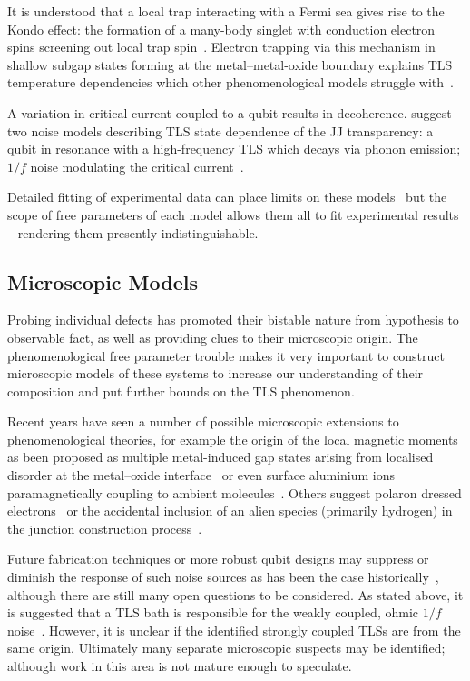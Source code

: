 It is understood that a local trap interacting with a Fermi sea gives rise to the Kondo effect: the formation of a many-body singlet with conduction electron spins screening out local trap spin~\cite{Wilson1975}.
Electron trapping via this mechanism in shallow subgap states forming at the metal--metal-oxide boundary explains TLS temperature dependencies which other phenomenological models struggle with~\cite{Faoro2007}.

\divtext

A variation in critical current coupled to a qubit results in decoherence.
\citeauthor{Ku2005} suggest two noise models describing TLS state dependence of the JJ transparency: a qubit in resonance with a high-frequency TLS which decays via phonon emission; $1/f$ noise modulating the critical current~\cite{Ku2005}.

\divtext

Detailed fitting of experimental data can place limits on these models~\cite{Cole2010} but the scope of free parameters of each model allows them all to fit experimental results -- rendering them presently indistinguishable.

\subsection{Microscopic Models}\label{sec:micromod}

Probing individual defects has promoted their bistable nature from hypothesis to observable fact, as well as providing clues to their microscopic origin.
The phenomenological free parameter trouble makes it very important to construct microscopic models of these systems to increase our understanding of their composition and put further bounds on the TLS phenomenon.

Recent years have seen a number of possible microscopic extensions to phenomenological theories, for example the origin of the local magnetic moments as been proposed as multiple metal-induced gap states arising from localised disorder at the metal--oxide interface~\cite{Choi2009} or even surface aluminium ions paramagnetically coupling to ambient molecules~\cite{Lee2014}.
Others suggest polaron dressed electrons~\cite{Agarwal2013} or the accidental inclusion of an alien species (primarily hydrogen) in the junction construction process~\cite{Jameson2011, Holder2013, Gordon2014}.

Future fabrication techniques or more robust qubit designs may suppress or diminish the response of such noise sources as has been the case historically~\cite{Vion2002, Martinis2005, Koch2007, Schreier2008, Houck2008}, although there are still many open questions to be considered.
As stated above, it is suggested that a TLS bath is responsible for the weakly coupled, ohmic $1/f$ noise~\cite{Dutta1981}.
However, it is unclear if the identified strongly coupled TLSs are from the same origin.
Ultimately many separate microscopic suspects may be identified; although work in this area is not mature enough to speculate.

